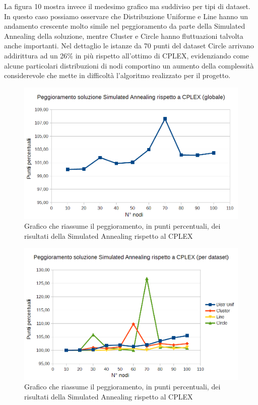 \documentclass[preprint,12pt]{elsarticle}
\begin{document}
La figura 10 mostra invece il medesimo grafico ma suddiviso per tipi di dataset. In questo caso possiamo osservare che Distribuzione Uniforme e Line hanno un andamento crescente molto simile nel peggioramento da parte della Simulated Annealing della soluzione, mentre Cluster e Circle hanno fluttuazioni talvolta anche importanti. Nel dettaglio le istanze da 70 punti del dataset Circle arrivano addirittura ad un 26\% in più rispetto all'ottimo di CPLEX, evidenziando come alcune particolari distribuzioni di nodi comportino un aumento della complessità considerevole che mette in difficoltà l'algoritmo realizzato per il progetto. 

\begin{figure}[htbp]
\centering
\includegraphics[scale=0.50]{grafici_confronti/peggioramento_SA_globale.png} 
\caption{Grafico che riassume il peggioramento, in punti percentuali, dei risultati della Simulated Annealing rispetto al CPLEX}\label{fig:9}
\end{figure}

\begin{figure}[htbp]
\centering
\includegraphics[scale=0.50]{grafici_confronti/peggioramento_SA.png} 
\caption{Grafico che riassume il peggioramento, in punti percentuali, dei risultati della Simulated Annealing rispetto al CPLEX}\label{fig:10}
\end{figure}
\end{document}
